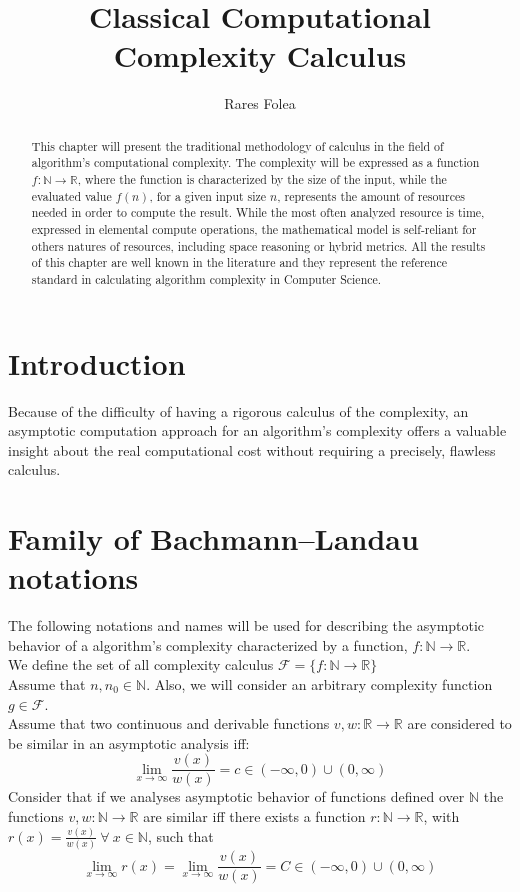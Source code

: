 \documentclass{article}
\title{Classical Computational Complexity Calculus }
\author{Rares Folea}
\begin{document}
\maketitle
\begin{abstract}
This chapter will present the traditional methodology of calculus in the field of algorithm's computational complexity. The complexity will be expressed as a function $f:\mathbb{N}\longrightarrow\mathbb{R}$, where the function is characterized by the size of the input, while the evaluated value $f(n)$, for a given input size $n$, represents the amount of resources needed in order to compute the result. While the most often analyzed resource is time, expressed in elemental compute operations, the mathematical model is self-reliant for others natures of resources, including space reasoning or hybrid metrics. All the results of this chapter are well known in the literature and they represent the reference standard in calculating algorithm complexity in Computer Science. 
\end{abstract}
\tableofcontents




\section{Introduction}
Because of the difficulty of having a rigorous calculus of the complexity, an asymptotic computation approach for an algorithm's complexity offers a valuable insight about the real computational cost without requiring a precisely, flawless calculus.



\section{Family of Bachmann–Landau notations}
The following notations and names will be used for describing the asymptotic behavior of a algorithm's complexity characterized by a function, $f:\mathbb{N}\longrightarrow\mathbb{R}$. \\
We define the set of all complexity calculus $\mathcal{F}= \lbrace f:\mathbb{N}\longrightarrow\mathbb{R} \rbrace$
\\Assume that $n, n_{0}\in\mathbb{N}$. Also, we will consider an arbitrary complexity function $g \in \mathcal{F}$. \\
Assume that two continuous and derivable functions $v,w:\mathbb{R}\longrightarrow\mathbb{R}$ are considered to be similar in an asymptotic analysis iff: 
  \[\lim_{x\to\infty} \frac{v(x)}{w(x)} = c \in (-\infty, 0) \cup (0,\infty) \]
  Consider that if we analyses asymptotic behavior of functions defined over $\mathbb{N}$ the functions $v,w:\mathbb{N}\longrightarrow\mathbb{R}$ are similar iff there exists a function $r:\mathbb{N}\longrightarrow\mathbb{R}$, with $r(x) = \frac{v(x)}{w(x)}\ \forall\ x\in\mathbb{N}$, such that
  \[\lim_{x\to\infty} r(x) = \lim_{x\to\infty} \frac{v(x)}{w(x)} = C \in (-\infty, 0) \cup (0,\infty) \]
  
\end{document}
